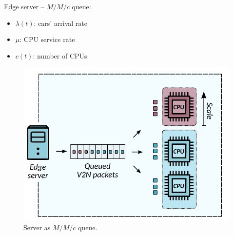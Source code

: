 \documentclass[aspectratio=169]{beamer}
\begin{document}
\begin{frame}
    \frametitle{\secname}
    \framesubtitle{\subsecname}

    \begin{minipage}{0.37\textwidth}
        Edge server -- $M/M/c$ queue:
        \begin{itemize}
            \item $\lambda(t)$: cars' arrival rate
            \item $\mu$: CPU service rate
            \item $c(t)$: number of CPUs
        \end{itemize}
    \end{minipage}
    \hfill
    \begin{minipage}{0.6\textwidth}
        \begin{figure}
            \centering
            \includegraphics[width=.8\textwidth]{img/MMc.pdf}
            \caption{Server as $M/M/c$ queue.}
        \end{figure}
    \end{minipage}
\end{frame}
\end{document}
